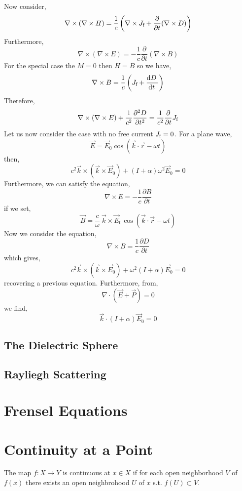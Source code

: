 \documentclass[12pt]{extarticle}
\renewcommand{\d}[1]{ \mathrm{d}#1 \:}
\newcommand{\deriv}[2]{\frac{\d{#1}}{\d{#2}}}
\newcommand{\pderiv}[2]{\frac{\partial{#1}}{\partial{#2}}}
\newcommand{\npar}[3]{\frac{\partial^{#1}{#2}}{\partial{#3}^{#1}}}
\theoremstyle{definition}
\newenvironment{definition}[1][Definition:]{\begin{trivlist}
\item[\hskip \labelsep {\bfseries #1}]}{\end{trivlist}}
\begin{document}
Now consider,
\[ \nabla \times (\nabla \times H) = \frac{1}{c} \left( \nabla \times J_{\free} +  \pderiv{}{t} (\nabla \times D ) \right) \]
Furthermore,
\[ \nabla \times (\nabla \times E) = - \frac{1}{c} \pderiv{}{t} ( \nabla \times B) \]
For the special case the $M = 0$ then $H = B$ so we have,
\[ \nabla \times B = \frac{1}{c} \left( J_{\free} + \deriv{D}{t} \right) \]
Therefore,
\[ \nabla \times (\nabla \times E) + \frac{1}{c^2} \npar{2}{D}{t} = \frac{1}{c^2} \pderiv{}{t} J_{\free} \] 
Let us now consider the case with no free current $J_{\text{f}} = 0$.
For a plane wave, 
\[ \vec{E} = \vec{E}_0 \cos{(\vec{k} \cdot \vec{r} - \omega t)} \]
then,
\[ c^2 \vec{k} \times (\vec{k} \times \vec{E}_0) + (I + \alpha) \omega^2 \vec{E}_0 = 0 \]
Furthermore, we can satisfy the equation,
\[ \nabla \times E = - \frac{1}{c} \pderiv{B}{t} \]
if we set,
\[ \vec{B} = \frac{c}{\omega} \: \vec{k} \times \vec{E}_0 \cos{(\vec{k} \cdot \vec{r} - \omega t)} \]
Now we consider the equation,
\[ \nabla \times B = \frac{1}{c} \pderiv{D}{t} \]
which gives,
\[  c^2 \vec{k} \times (\vec{k} \times \vec{E}_0) + \omega^2 (I + \alpha) \vec{E}_0 = 0 \]
recovering a previous equation. Furthermore, from,
\[ \nabla \cdot (\vec{E} + \vec{P}) = 0 \]
we find,
\[ \vec{k} \cdot (I + \alpha) \vec{E}_0 = 0 \]

\subsection{The Dielectric Sphere}

\subsection{Rayliegh Scattering}

\section{Frensel Equations}



\section{Continuity at a Point}

\begin{definition}
The map $f : X \to Y$ is continuous at $x \in X$ if for each open neighborhood $V$ of $f(x)$ there exists an open neighbrohood $U$ of $x$ s.t. $f(U) \subset V$.
\end{definition}
\end{document}
